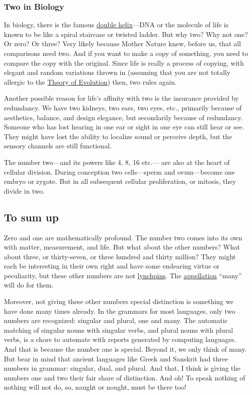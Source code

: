 \documentclass[
  a4paper,
]{article}
\begin{document}
\hypertarget{two-in-biology}{%
\subsubsection{Two in Biology}\label{two-in-biology}}

In biology, there is the famous
\href{https://www.genome.gov/genetics-glossary/Double-Helix}{double
helix}---DNA or the molecule of life is known to be like a spiral
staircase or twisted ladder. But why two? Why not one? Or zero? Or
three? Very likely because Mother Nature knew, before us, that all
comparisons need two. And if you want to make a copy of something, you
need to compare the copy with the original. Since life is really a
process of copying, with elegant and random variations thrown in
(assuming that you are not totally allergic to the
\href{https://www.livescience.com/474-controversy-evolution-works.html}{Theory
of Evolution}) then, two rules again.

Another possible reason for life's affinity with two is the insurance
provided by redundancy. We have two kidneys, two ears, two eyes, etc.,
primarily because of aesthetics, balance, and design elegance, but
secondarily because of redundancy. Someone who has lost hearing in one
ear or sight in one eye can still hear or see. They might have lost the
ability to localize sound or perceive depth, but the sensory channels
are still functional.

The number two---and its powers like 4, 8, 16 etc.--- are also at the
heart of cellular division. During conception two cells---sperm and
ovum---become one embryo or zygote. But in all subsequent cellular
proliferation, or mitosis, they divide in two.

\hypertarget{to-sum-up}{%
\subsection{To sum up}\label{to-sum-up}}

Zero and one are mathematically profound. The number two comes into its
own with matter, measurement, and life. But what about the other
numbers? What about three, or thirty-seven, or three hundred and thirty
million? They might each be interesting in their own right and have some
endearing virtue or peculiarity, but these other numbers are not
\href{https://www.thefreedictionary.com/lynchpin}{lynchpins}. The
\href{https://www.dictionary.com/browse/appellation}{appellation}
``many'' will do for them.

Moreover, not giving these other numbers special distinction is
something we have done many times already. In the grammars for most
languages, only two numbers are recognized: singular and plural, one and
many. The automatic matching of singular nouns with singular verbs, and
plural nouns with plural verbs, is a chore to automate with reports
generated by computing languages. And that is because the number one is
special. Beyond it, we only think of many. But bear in mind that ancient
languages like Greek and Sanskrit had three numbers in grammar:
singular, dual, and plural. And that, I think is giving the numbers one
and two their fair share of distinction. And oh! To speak nothing of
nothing will not do, so, naught or nought, must be there too!
\end{document}
